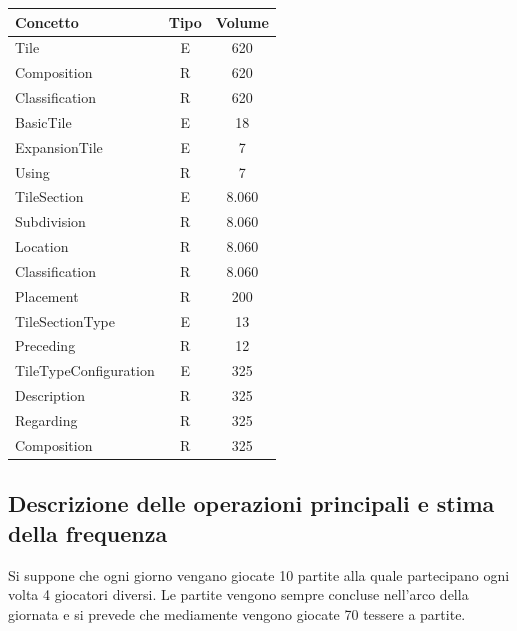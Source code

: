 {\begin{tabular}{ |l|c|c| }
\hline
\end{tabular}
\begin{tabular}{ |l|c|c| }
\hline
\textbf{Concetto} & \textbf{Tipo} & \textbf{Volume} \\
\hline
Tile & E & 620 \\
Composition & R & 620 \\
Classification & R & 620 \\
BasicTile & E & 18 \\
ExpansionTile & E & 7 \\
Using & R & 7 \\
\hline
TileSection & E & 8.060 \\
Subdivision & R & 8.060 \\
Location & R & 8.060 \\
Classification & R & 8.060 \\
Placement & R & 200 \\
TileSectionType & E & 13 \\
Preceding & R & 12 \\
\hline
TileTypeConfiguration & E & 325 \\
Description & R & 325 \\
Regarding & R & 325 \\
Composition & R & 325 \\
\hline
\end{tabular}}

\subsection{Descrizione delle operazioni principali e stima della frequenza}
Si suppone che ogni giorno vengano giocate 10 partite alla quale partecipano ogni volta 4 giocatori diversi. Le partite vengono sempre concluse nell'arco della giornata e si prevede che mediamente vengono giocate 70 tessere a partite.
\medskip


